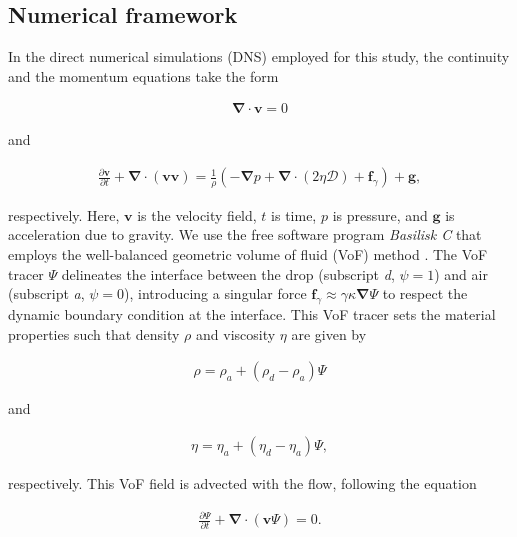 \documentclass{jfm}
\begin{document}
\subsection{Numerical framework}

In the direct numerical simulations (DNS) employed for this study, the continuity and the momentum equations take the form

\begin{align}\label{eqn:continuity}
	\boldsymbol{\nabla\cdot v} = 0 
\end{align}

\noindent and

\begin{align}
	\frac{\partial \boldsymbol{v}}{\partial t} + \boldsymbol{\nabla \cdot}\left(\boldsymbol{vv}\right) = \frac{1}{\rho}\left(-\boldsymbol{\nabla} p + \boldsymbol{\nabla\cdot}\left(2\eta\boldsymbol{\mathcal{D}}\right)  + \boldsymbol{f}_\gamma\right) + \boldsymbol{g},
\end{align}

\noindent respectively. Here, $\boldsymbol{v}$ is the velocity field, $t$ is time, $p$ is pressure, and $\boldsymbol{g}$ is acceleration due to gravity. We use the free software program \textit{Basilisk C} that employs the well-balanced geometric volume of fluid (VoF) method \citep{popinet2009accurate, popinet2018numerical}. The VoF tracer $\Psi$ delineates the interface between the drop (subscript \textit{d}, $\psi = 1$)  and air (subscript \textit{a}, $\psi = 0$), introducing a singular force $\boldsymbol{f}_\gamma \approx \gamma\kappa\boldsymbol{\nabla}\Psi$ \citep[$\kappa$ denotes interfacial curvature, see][]{brackbill1992continuum} to respect the dynamic boundary condition at the interface. This VoF tracer sets the material properties such that density $\rho$ and viscosity $\eta$ are given by

\begin{align}
	\rho = \rho_a + \left(\rho_d - \rho_a\right)\Psi
\end{align}

\noindent and

\begin{align}
	\eta = \eta_a + \left(\eta_d - \eta_a\right)\Psi,
\end{align}

\noindent respectively. This VoF field is advected with the flow, following the equation

\begin{align}\label{eqn:VoF}
	\frac{\partial \Psi}{\partial t} + \boldsymbol{\nabla \cdot}\left(\boldsymbol{v}\Psi\right) = 0.
\end{align}
\end{document}
